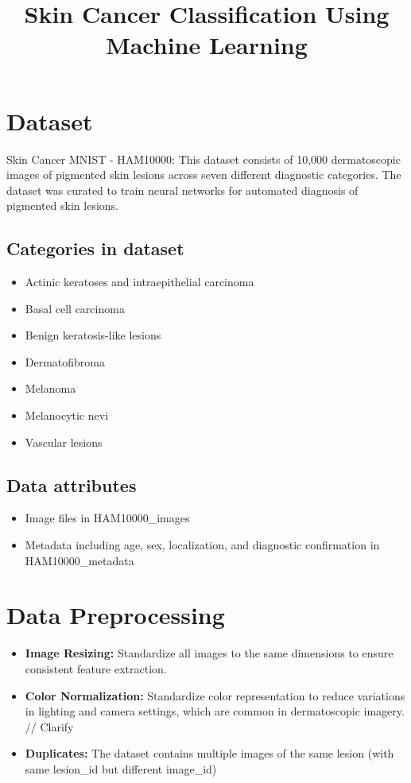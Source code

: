 \documentclass{article}
\title{Skin Cancer Classification Using Machine Learning}
\author{}
\date{}
\begin{document}
\maketitle

\section{Dataset}

Skin Cancer MNIST - HAM10000: This dataset consists of 10,000 dermatoscopic images of pigmented skin lesions across seven different diagnostic categories. The dataset was curated to train neural networks for automated diagnosis of pigmented skin lesions.

\subsection{Categories in dataset}
\begin{itemize}
    \item Actinic keratoses and intraepithelial carcinoma 
    \item Basal cell carcinoma 
    \item Benign keratosis-like lesions 
    \item Dermatofibroma
    \item Melanoma 
    \item Melanocytic nevi 
    \item Vascular lesions 
\end{itemize}

\subsection{Data attributes}
\begin{itemize}
    \item Image files in HAM10000\_images
    \item Metadata including age, sex, localization, and diagnostic confirmation in HAM10000\_metadata
\end{itemize}

\section{Data Preprocessing}
\begin{itemize}
    \item \textbf{Image Resizing:} Standardize all images to the same dimensions to ensure consistent feature extraction.
    \item \textbf{Color Normalization:} Standardize color representation to reduce variations in lighting and camera settings, which are common in dermatoscopic imagery. // Clarify
    \item \textbf{Duplicates:} The dataset contains multiple images of the same lesion (with same lesion\_id but different image\_id)
\end{itemize}
\end{document}
